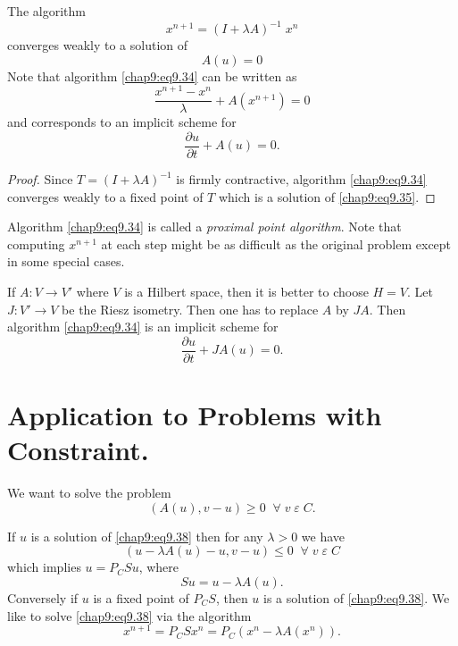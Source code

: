 \begin{Cor}\label{chap9:cor1}
The algorithm 
\setcounter{equation}{33}
\begin{equation}\label{chap9:eq9.34}
x^{n+1}=(I+\lambda A)^{-1}\;x^n
\end{equation}
converges weakly to a solution of 
\begin{equation}\label{chap9:eq9.35}
A(u)=0
\end{equation}
Note that algorithm \eqref{chap9:eq9.34} can be written as 
\begin{equation}\label{chap9:eq9.36}
\frac{x^{n+1}-x^n}{\lambda}+A(x^{n+1})=0
\end{equation}\pageoriginale
and corresponds to an implicit scheme for 
\begin{equation}\label{chap9:eq9.37}
\frac{\partial u}{\partial t}+A(u)=0.
\end{equation}
\end{Cor}

\begin{proof}
Since $T=(I+\lambda A)^{-1}$ is firmly contractive, algorithm
\eqref{chap9:eq9.34} converges weakly to a fixed point of $T$ which is
a solution of \eqref{chap9:eq9.35}. 
\end{proof}

\begin{REM}\label{chap9:rem2}
Algorithm \eqref{chap9:eq9.34} is called a \emph{proximal point
  algorithm}. Note that computing $x^{n+1}$ at each step might be as
difficult as the original problem except in some special cases.
\end{REM}

\begin{REM}\label{chap9:rem3}
If $A:V\to V'$ where $V$ is a Hilbert space, then it is better to
choose $H=V$. Let $J:V'\to V$ be the Riesz isometry. Then one has to
replace $A$ by $JA$. Then algorithm \eqref{chap9:eq9.34} is an
implicit scheme for 
$$
\frac{\partial u}{\partial t}+JA(u)=0.
$$
\end{REM}

\section{Application to Problems with Constraint.}\label{chap9:sec5}
We want to solve the problem
\begin{equation}\label{chap9:eq9.38}
(A(u),v-u)\geq 0\; \; \forall \;v \;\varepsilon \;C.
\end{equation}

If $u$ is a solution of \eqref{chap9:eq9.38} then for any $\lambda >0$
we have 
$$
(u-\lambda A(u)-u, v-u)\leq 0 \; \; \forall \; v \; \varepsilon \;C
$$\pageoriginale
which implies $u=P_CSu$, where 
$$
Su=u-\lambda A(u).
$$
Conversely if $u$ is a fixed point of $P_CS$, then $u$ is a solution
of \eqref{chap9:eq9.38}. We like to solve \eqref{chap9:eq9.38} via the
algorithm
\begin{equation}\label{chap9:eq9.39}
x^{n+1}=P_CSx^n=P_C(x^n-\lambda A(x^n)).
\end{equation}

